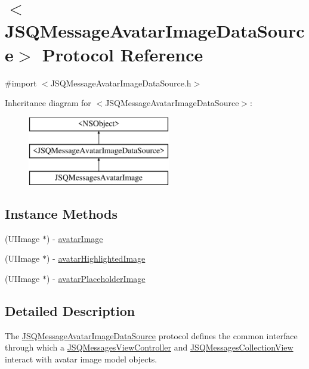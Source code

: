 \hypertarget{protocol_j_s_q_message_avatar_image_data_source-p}{}\section{$<$J\+S\+Q\+Message\+Avatar\+Image\+Data\+Source$>$ Protocol Reference}
\label{protocol_j_s_q_message_avatar_image_data_source-p}


{\ttfamily \#import $<$J\+S\+Q\+Message\+Avatar\+Image\+Data\+Source.\+h$>$}

Inheritance diagram for $<$J\+S\+Q\+Message\+Avatar\+Image\+Data\+Source$>$\+:\begin{figure}[H]
\begin{center}
\leavevmode
\includegraphics[height=3.000000cm]{protocol_j_s_q_message_avatar_image_data_source-p}
\end{center}
\end{figure}
\subsection*{Instance Methods}
\begin{DoxyCompactItemize}
\item 
(U\+I\+Image $\ast$) -\/ \hyperlink{protocol_j_s_q_message_avatar_image_data_source-p_ad76e99d9fd9d867a65cdde5cea7b64e4}{avatar\+Image}
\item 
(U\+I\+Image $\ast$) -\/ \hyperlink{protocol_j_s_q_message_avatar_image_data_source-p_a067f395c36ff8170d680ee924cceb302}{avatar\+Highlighted\+Image}
\item 
(U\+I\+Image $\ast$) -\/ \hyperlink{protocol_j_s_q_message_avatar_image_data_source-p_af47620d007d61a9b2c73efd9733d45d5}{avatar\+Placeholder\+Image}
\end{DoxyCompactItemize}


\subsection{Detailed Description}
The {\ttfamily \hyperlink{protocol_j_s_q_message_avatar_image_data_source-p}{J\+S\+Q\+Message\+Avatar\+Image\+Data\+Source}} protocol defines the common interface through which a {\ttfamily \hyperlink{interface_j_s_q_messages_view_controller}{J\+S\+Q\+Messages\+View\+Controller}} and {\ttfamily \hyperlink{interface_j_s_q_messages_collection_view}{J\+S\+Q\+Messages\+Collection\+View}} interact with avatar image model objects.

